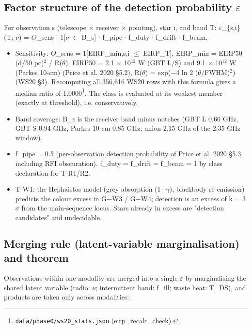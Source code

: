 \documentclass{aa}
\begin{document}
\subsection{Factor structure of the detection probability \(\varepsilon\)}
\noindent For observation s (telescope \(\times\) receiver \(\times\) pointing), star i, and band T: \(\varepsilon\)\_\{s,i\}(T; \(\nu\)) = \(\Theta\)\_sens \(\cdot\) 1[\(\nu\) \(\in\) B\_s] \(\cdot\) f\_pipe \(\cdot\) f\_duty \(\cdot\) f\_drift \(\cdot\) f\_beam.\par\smallskip
\begin{itemize}\setlength{\itemsep}{1pt}
\item Sensitivity: \(\Theta\)\_sens = 1[EIRP\_min,s,i \(\leq\) EIRP\_T], EIRP\_min = EIRP50 (d/50 pc)\(^{2}\) / R(\(\theta\)), EIRP50 = 2.1 \(\times\) 10\(^{12}\) W (GBT L/S) and 9.1 \(\times\) 10\(^{12}\) W (Parkes 10-cm) (Price et al. 2020 \S{}5.2), R(\(\theta\)) = exp(\(-\)4 ln 2 (\(\theta\)/FWHM)\(^{2}\)) (WS20 \S{}3). Recomputing all 356,616 WS20 rows with this formula gives a median ratio of 1.0000\footnote{\texttt{data/phase0/ws20\_stats.json} (eirp\_recalc\_check).}. The class is evaluated at its weakest member (exactly at threshold), i.e. conservatively.
\item Band coverage: B\_s is the receiver band minus notches (GBT L 0.66 GHz, GBT S 0.94 GHz, Parkes 10-cm 0.85 GHz; union 2.15 GHz of the 2.35 GHz window).
\item f\_pipe = 0.5 (per-observation detection probability of Price et al. 2020 \S{}5.3, including RFI obscuration). f\_duty = f\_drift = f\_beam = 1 by class declaration for T-R1/R2.
\item T-W1: the Hephaistos model (grey absorption (1\(-\)\(\gamma\)), blackbody re-emission) predicts the colour excess in G\(-\)W3 / G\(-\)W4; detection is an excess of k = 3 \(\sigma\) from the main-sequence locus. Stars already in excess are "detection candidates" and undecidable.
\end{itemize}


\subsection{Merging rule (latent-variable marginalisation) and theorem}
\noindent Observations within one modality are merged into a single \(\varepsilon\) by marginalising the shared latent variable (radio: \(\nu\); intermittent band: f\_ill; waste heat: T\_DS), and products are taken only across modalities:\par\smallskip
\end{document}
